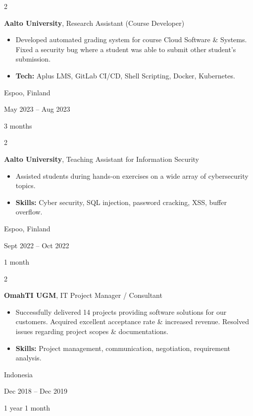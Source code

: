 \documentclass[10pt, a4paper]{article}
\newenvironment{highlights}{
    \begin{itemize}[
        topsep=0.10 cm,
        parsep=0.10 cm,
        partopsep=0pt,
        itemsep=0pt,
        leftmargin=0 cm + 10pt
    ]
}{
    \end{itemize}
} %
\newenvironment{twocolentry}[2][]{
    \onecolentry
    \def\secondColumn{#2}
    \setcolumnwidth{\fill, 3 cm}
    \begin{paracol}{2}
}{
    \switchcolumn \raggedleft \secondColumn
    \end{paracol}
    \endonecolentry
} %
\begin{document}
        \vspace{0.2 cm}

        \begin{twocolentry}{
            Espoo, Finland

        May 2023 – Aug 2023

        3 months
        }
            \textbf{Aalto University}, Research Assistant (Course Developer)
            \begin{highlights}
                \item Developed automated grading system for course Cloud Software \& Systems. Fixed a security bug where a student was able to submit other student's submission.
                \item \textbf{Tech:} Aplus LMS, GitLab CI/CD, Shell Scripting, Docker, Kubernetes.
            \end{highlights}
        \end{twocolentry}


        \vspace{0.2 cm}

        \begin{twocolentry}{
            Espoo, Finland

        Sept 2022 – Oct 2022

        1 month
        }
            \textbf{Aalto University}, Teaching Assistant for Information Security
            \begin{highlights}
                \item Assisted students during hands-on exercises on a wide array of cybersecurity topics.
                \item \textbf{Skills:} Cyber security, SQL injection, password cracking, XSS, buffer overflow.
            \end{highlights}
        \end{twocolentry}


        \vspace{0.2 cm}

        \begin{twocolentry}{
            Indonesia

        Dec 2018 – Dec 2019

        1 year 1 month
        }
            \textbf{OmahTI UGM}, IT Project Manager / Consultant
            \begin{highlights}
                \item Successfully delivered 14 projects providing software solutions for our customers. Acquired excellent acceptance rate \& increased revenue. Resolved issues regarding project scopes \& documentations.
                \item \textbf{Skills:} Project management, communication, negotiation, requirement analysis.
            \end{highlights}
        \end{twocolentry}
\end{document}
